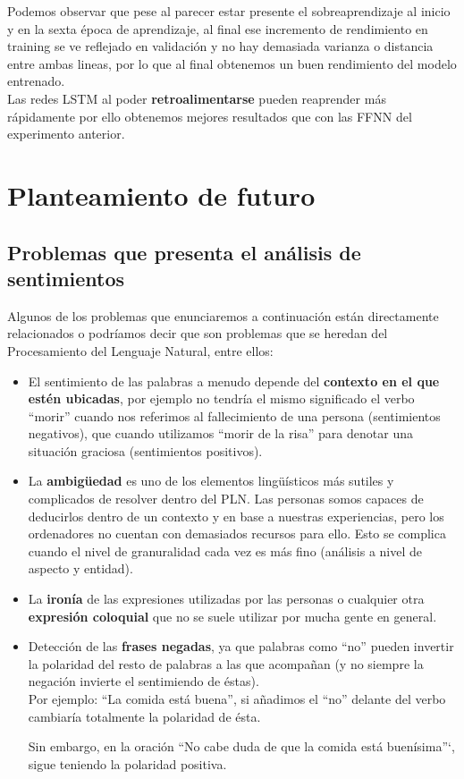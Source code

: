 \documentclass[a4paper,12pt]{report}
\begin{document}
\vspace{4mm}
Podemos observar que pese al parecer estar presente el sobreaprendizaje al inicio y en la sexta época de aprendizaje, al final ese incremento de rendimiento en training se ve reflejado en validación y no hay demasiada varianza o distancia entre ambas lineas, por lo que al final obtenemos un buen rendimiento del modelo entrenado.
\vspace{2mm}\\
Las redes LSTM al poder \textbf{retroalimentarse} pueden reaprender más rápidamente por ello obtenemos mejores resultados que con las FFNN del experimento anterior.


\chapter{Planteamiento de futuro}

\section{Problemas que presenta el análisis de sentimientos}

Algunos de los problemas que enunciaremos a continuación están directamente relacionados o podríamos decir que son problemas que se heredan del Procesamiento del Lenguaje Natural, entre ellos:

\begin{itemize}
\item El sentimiento de las palabras a menudo depende del \textbf{contexto en el que estén ubicadas}, por ejemplo no tendría el mismo significado el verbo ``morir'' cuando nos referimos al fallecimiento de una persona (sentimientos negativos), que cuando utilizamos ``morir de la risa'' para denotar una situación graciosa (sentimientos positivos).

\item La \textbf{ambigüedad} es uno de los elementos lingüísticos más sutiles y complicados de resolver dentro del PLN. Las personas somos capaces de deducirlos dentro de un contexto y en base a nuestras experiencias, pero los ordenadores no cuentan con demasiados recursos para ello. Esto se complica cuando el nivel de granuralidad cada vez es más fino (análisis a nivel de aspecto y entidad).

\item  La \textbf{ironía} de las expresiones utilizadas por las personas o cualquier otra \textbf{expresión coloquial} que no se suele utilizar por mucha gente en general. 

\item Detección de las \textbf{frases negadas}, ya que palabras como ``no'' pueden invertir la polaridad del resto de palabras a las que acompañan (y no siempre la negación invierte el sentimiendo de éstas). 
\vspace{2mm}\\
Por ejemplo: ``La comida está buena'', si añadimos el ``no'' delante del verbo cambiaría totalmente la polaridad de ésta. 

Sin embargo, en la oración ``No cabe duda de que la comida está buenísima''`, sigue teniendo la polaridad positiva.

\end{itemize}
\end{document}
